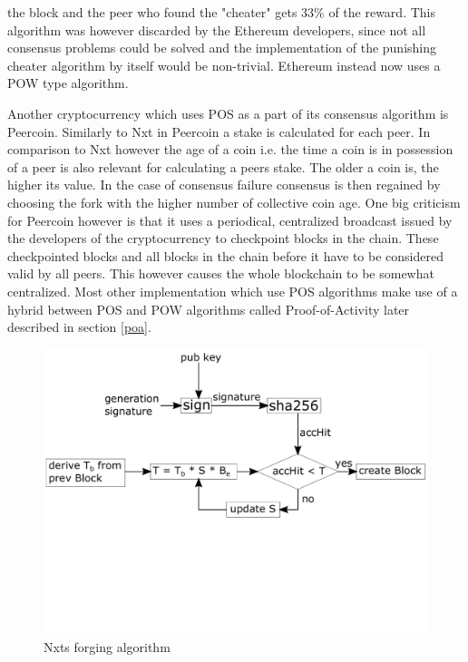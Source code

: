 the block and the peer who found the "cheater" gets 33\% of the reward.\cite{url:eth_slash} This algorithm was however discarded by the Ethereum developers, since not all consensus problems could be
solved and the implementation of the punishing cheater algorithm by itself would be non-trivial.\cite{url:eth_no_slash} Ethereum instead now uses a POW type algorithm.\cite{url:eth_pow}\par Another
cryptocurrency which uses POS as a part of its consensus algorithm is Peercoin. Similarly to Nxt in Peercoin a stake is calculated for each peer. In comparison to Nxt however the age of a coin i.e.
the time a coin is in possession of a peer is also relevant for calculating a peers stake. The older a coin is, the higher its value. In the case of consensus failure consensus is then regained by
choosing the fork with the higher number of collective coin age.\cite{url:peercoin} One big criticism for Peercoin however is that it uses a periodical, centralized broadcast issued by the developers
of the cryptocurrency to checkpoint blocks in the chain. These checkpointed blocks and all blocks in the chain before it have to be considered valid by all peers. This however causes the whole
blockchain to be somewhat centralized. Most other implementation which use POS algorithms make use of a hybrid between POS and POW algorithms called Proof-of-Activity later described in section
\ref{poa}.

\begin{figure}[ht]
\center
\includegraphics[width=1\columnwidth]{fig/PoS.pdf}
\caption{Nxts forging algorithm}
\end{figure}

